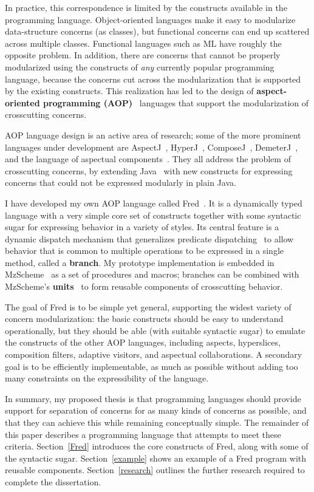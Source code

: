 \documentclass{article}
\newcommand{\defn}[1]{\textbf{#1}}
\begin{document}
In practice, this correspondence is limited by the constructs
available in the programming language.  Object-oriented languages make
it easy to modularize data-structure concerns (as classes), but
functional concerns can end up scattered across multiple classes.
Functional languages such as ML have roughly the opposite problem.  In
addition, there are concerns that cannot be properly modularized using
the constructs of \emph{any} currently popular programming language,
because the concerns cut across the modularization that is supported
by the existing constructs.  This realization has led to the design of
\defn{aspect-oriented programming (AOP)}~\cite{AOP} languages that
support the modularization of crosscutting concerns.

AOP language design is an active area of research; some of the more
prominent languages under development are AspectJ~\cite{AspectJ},
HyperJ~\cite{HyperJ}, ComposeJ~\cite{ComposeJ},
DemeterJ~\cite{DemeterJ}, and the language of aspectual
components~\cite{ACs}.  They all address the problem of crosscutting
concerns, by extending Java~\cite{JLS} with new constructs for
expressing concerns that could not be expressed modularly in plain
Java.

I have developed my own AOP language called Fred~\cite{Fred}.  It is a
dynamically typed language with a very simple core set of constructs
together with some syntactic sugar for expressing behavior in a
variety of styles.  Its central feature is a dynamic dispatch
mechanism that generalizes predicate
dispatching~\cite{predicate-dispatch} to allow behavior that is common
to multiple operations to be expressed in a single method, called a
\defn{branch}.  My prototype implementation is embedded in
MzScheme~\cite{MzScheme} as a set of procedures and macros; branches
can be combined with MzScheme's \defn{units}~\cite{units} to form
reusable components of crosscutting behavior.

The goal of Fred is to be simple yet general, supporting the widest
variety of concern modularization: the basic constructs should be easy
to understand operationally, but they should be able (with suitable
syntactic sugar) to emulate the constructs of the other AOP languages,
including aspects, hyperslices, composition filters, adaptive
visitors, and aspectual collaborations.  A secondary goal is to be
efficiently implementable, as much as possible without adding too many
constraints on the expressibility of the language.

In summary, my proposed thesis is that programming languages should
provide support for separation of concerns for as many kinds of
concerns as possible, and that they can achieve this while remaining
conceptually simple.  The remainder of this paper describes a
programming language that attempts to meet these criteria.
Section~\ref{Fred} introduces the core constructs of Fred, along with
some of the syntactic sugar.  Section~\ref{example} shows an example
of a Fred program with reusable components.  Section~\ref{research}
outlines the further research required to complete the dissertation.
\end{document}
